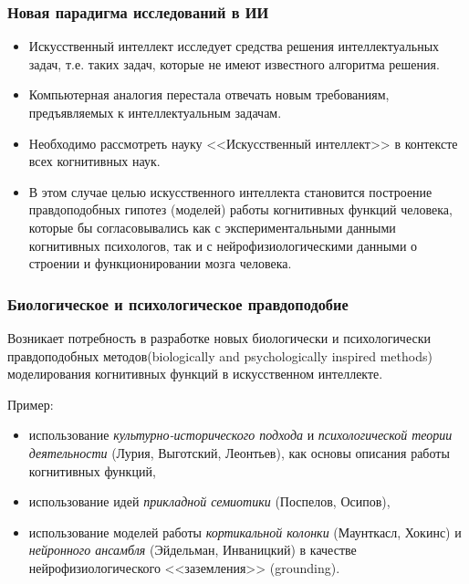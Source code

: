 \documentclass[default]{beamer}
\begin{document}
	\begin{frame}
		\frametitle{Новая парадигма исследований в ИИ}
		
		\begin{itemize}
			\item Искусственный интеллект исследует средства решения интеллектуальных задач, т.е. таких задач, которые не имеют известного алгоритма решения.
			\item Компьютерная аналогия перестала отвечать новым требованиям, предъявляемых к интеллектуальным задачам.
			\item Необходимо рассмотреть науку <<Искусственный интеллект>> в контексте всех когнитивных наук.
			\item В этом случае целью искусственного интеллекта становится построение правдоподобных гипотез (моделей) работы когнитивных функций человека, которые бы согласовывались как с экспериментальными данными когнитивных психологов, так и с нейрофизиологическими данными о строении и функционировании мозга человека.
		\end{itemize}
	\end{frame}

	\begin{frame}
		\frametitle{Биологическое и психологическое правдоподобие}
		
		Возникает потребность в разработке новых биологически и психологически правдоподобных методов(biologically and psychologically inspired methods)  моделирования когнитивных функций в искусственном интеллекте.
		\par\bigskip
		Пример:
		\begin{itemize}
			\item использование\textit{ культурно-исторического подхода} и  \textit{психологической теории деятельности} (Лурия, Выготский, Леонтьев), как основы описания работы когнитивных функций,
			\item использование идей\textit{ прикладной семиотики} (Поспелов, Осипов),
			\item использование моделей работы\textit{ кортикальной колонки} (Маунткасл, Хокинс) и \textit{нейронного ансамбля} (Эйдельман, Инваницкий) в качестве нейрофизиологического <<заземления>> (grounding).
		\end{itemize}
	\end{frame}
\end{document}
